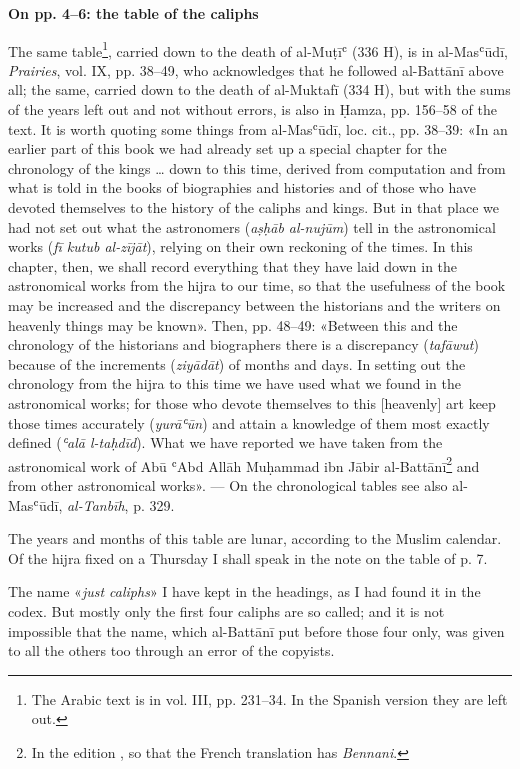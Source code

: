 \documentclass[11pt]{article}
\newcommand{\Pg}[1]{\marginpar{\footnotesize\color{gray}#1}}
\newcommand{\UnitHead}[2]{\par\setcounter{footnoteT}{0}\needspace{8\baselineskip}\bigskip\pdfbookmark[1]{#1}{unit-#2}\hypertarget{EN-#2}{}%
 {\large\bfseries\interlinepenalty=10000 #1\par}\nobreak\medskip}
\begin{document}
\UnitHead{On pp. 4–6: the table of the caliphs}{T02}
\par The same table\footnote{The Arabic text is in vol. III, pp. 231–34. In the Spanish version they are left out.}, carried down to the death of al-Muṭīʿ (336 H), is in al-Masʿūdī, \emph{Prairies}, vol. IX, pp. 38–49, who acknowledges that he followed al-Battānī above all; the same, carried down to the death of al-Muktafī (334 H), but with the sums of the years left out and not without errors, is also in Ḥamza, pp. 156–58 of the text. It is worth quoting some things from al-Masʿūdī, loc. cit., pp. 38–39: «In an earlier part of this book we had already set up a special chapter for the chronology of the kings … down to this time, derived from computation and from what is told in the books of biographies and histories and of those who have devoted themselves to the history of the caliphs and kings. But in that place we had not set out what the astronomers (\emph{aṣḥāb al-nujūm}) tell in the astronomical works (\emph{fī kutub al-zījāt}), relying on their own reckoning of the times. In this chapter, then, we shall record everything that they have laid down in the astronomical works from the hijra to our time, so that the usefulness of the book may be increased and the discrepancy between the historians and the writers on heavenly things may be known». Then, pp. 48–49: «Between this and the chronology of the historians and biographers there is a discrepancy (\emph{tafāwut}) because of the increments (\emph{ziyādāt}) of months and days. In setting out the chronology from the hijra to this time we have used what we found in the astronomical works; for those who devote themselves to this [heavenly] art keep those times accurately (\emph{yurāʿūn}) and attain a knowledge of them most exactly defined (\emph{ʿalā l-taḥdīd}). What we have reported we have taken from the astronomical work of Abū ʿAbd Allāh Muḥammad ibn Jābir al-Battānī\footnote{In the edition , so that the French translation has \emph{Bennani}.} and from other astronomical works». — On the chronological tables see also al-Masʿūdī, \emph{al-Tanbīh}, p. 329.\par
\par \Pg{II 198}The years and months of this table are lunar, according to the Muslim calendar. Of the hijra fixed on a Thursday I shall speak in the note on the table of p. 7.\par
\par The name «\emph{just caliphs}» I have kept in the headings, as I had found it in the codex. But mostly only the first four caliphs are so called; and it is not impossible that the name, which al-Battānī put before those four only, was given to all the others too through an error of the copyists.\par
\end{document}
